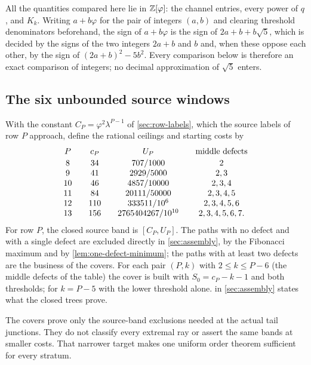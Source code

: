 All the quantities compared here lie in $\mathbb{Z}[\varphi]$: the channel
entries, every power of $q$, and $K_k$. Writing $a+b\varphi$ for the pair
of integers $(a,b)$ and clearing threshold denominators beforehand, the
sign of $a+b\varphi$ is the sign of $2a+b+b\sqrt5$, which is decided by
the signs of the two integers $2a+b$ and $b$ and, when these oppose each
other, by the sign of $(2a+b)^2-5b^2$. Every comparison below is therefore
an exact comparison of integers; no decimal approximation of $\sqrt5$
enters.

\subsection{The six unbounded source windows}

With the constant $C_P=\varphi^2\lambda^{P-1}$ of \cref{sec:row-labels}, which
the source labels of row $P$ approach, define the rational ceilings and
starting costs by
\begin{equation}
 \begin{array}{c@{\qquad}c@{\qquad}c@{\qquad}c}
 P&c_P&U_P&\text{middle defects}\\[2pt]
 8&34&707/1000&2\\
 9&41&2929/5000&2,3\\
 10&46&4857/10000&2,3,4\\
 11&84&20111/50000&2,3,4,5\\
 12&110&333511/10^6&2,3,4,5,6\\
 13&156&2765404267/10^{10}&2,3,4,5,6,7.
 \end{array}
 \label{eq:tail-source-windows}
\end{equation}
For row $P$, the closed source band is $[C_P,U_P]$. The paths with no
defect and with a single defect are excluded directly in \cref{sec:assembly},
by the Fibonacci maximum and by \cref{lem:one-defect-minimum}; the paths with
at least two defects are the business of the covers. For each pair $(P,k)$
with $2\leqslant k\leqslant P-6$ (the middle defects of the table) the cover
is built with $S_0=c_P-k-1$ and both thresholds; for $k=P-5$ with the lower
threshold alone.  in \cref{sec:assembly} states what
the closed trees prove.

The covers prove only the source-band exclusions needed at the actual tail
junctions. They do not classify every extremal ray or assert the same bands
at smaller costs. That narrower target makes one uniform order theorem
sufficient for every stratum.
